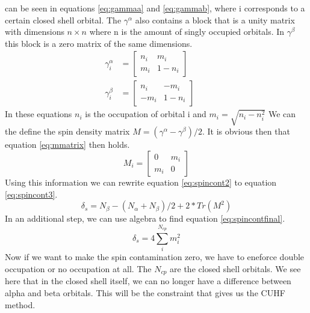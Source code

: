 \documentclass[twoside,twocolumn,9pt]{article}
\begin{document}
can be seen in equations \eqref{eq:gammaa} and \eqref{eq:gammab}, where i corresponds to a certain closed shell orbital. The $\gamma^\alpha$ also contains a block that is a
unity matrix with dimensions $n\times n$ where n is the amount of singly occupied orbitals. In $\gamma^\beta$ this block is a zero matrix of the same dimensions.
\begin{subequations}
  \begin{align}
    \label{eq:gammaa}
    \gamma^\alpha_i & = \begin{bmatrix}
      n_i & m_i    \\
      m_i & 1- n_i
    \end{bmatrix} &  & \\
    \label{eq:gammab}
    \gamma^\beta_i  & = \begin{bmatrix}
      n_i  & -m_i  \\
      -m_i & 1-n_i
    \end{bmatrix} &  &
  \end{align}
\end{subequations}
In these equations $n_i$ is the occupation of orbital i and $m_i = \sqrt{n_i - n_i^2}$\cite{Scuseria2010} We can the define the spin density matrix $M = (\gamma^\alpha - \gamma^\beta)/2$. It is obvious then that equation \eqref{eq:mmatrix} then holds.
\begin{equation}\label{eq:mmatrix}
  M_i = \begin{bmatrix}
    0   & m_i \\
    m_i & 0
  \end{bmatrix}
\end{equation}
Using this information we can rewrite equation \eqref{eq:spincont2} to equation \eqref{eq:spincont3}\cite{Scuseria2010}.
\begin{equation}\label{eq:spincont3}
  \delta_s = N_\beta - (N_\alpha + N_\beta)/2 + 2*Tr(M^2)
\end{equation}
In an additional step, we can use algebra to find equation \eqref{eq:spincontfinal}.
\begin{equation}\label{eq:spincontfinal}
  \delta_s = 4\sum^{N_{cp}}_i m_i^2
\end{equation}
Now if we want to make the spin contamination zero, we have to eneforce double occupation or no occupation at all. The $N_{cp}$ are the closed shell orbitals. We see here that in
the closed shell itself, we can no longer have a difference between alpha and beta orbitals. This will be the constraint that gives us the CUHF method.
\end{document}
